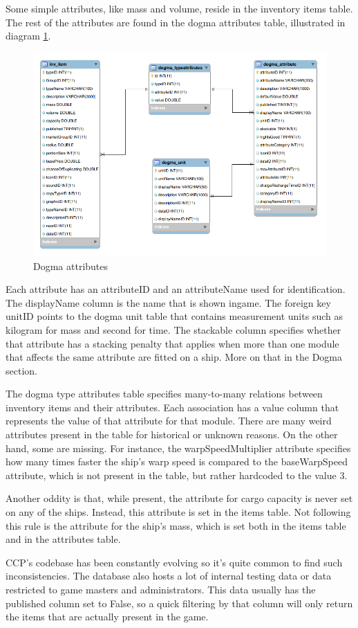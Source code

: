 Some simple attributes, like mass and volume, reside in the inventory items table. The rest of the attributes are found in the dogma attributes table, illustrated in diagram \ref{fig:dogmaattribs}.

\begin{figure}[h]
\centering
\includegraphics[width=0.7\linewidth]{src/img/dogmaattribs}
\caption{Dogma attributes}
\label{fig:dogmaattribs}
\end{figure}

Each attribute has an attributeID and an attributeName used for identification. The displayName column is the name that is shown ingame. The foreign key unitID points to the dogma unit table that contains measurement units such as kilogram for mass and second for time. The stackable column specifies whether that attribute has a stacking penalty \cite{stacking} that applies when more than one module that affects the same attribute are fitted on a ship. More on that in the Dogma section.

The dogma type attributes table specifies many-to-many relations between inventory items and their attributes. Each association has a value column that represents the value of that attribute for that module. There are many weird attributes present in the table for historical or unknown reasons. On the other hand, some are missing. For instance, the warpSpeedMultiplier attribute specifies how many times faster the ship’s warp speed is compared to the baseWarpSpeed attribute, which is not present in the table, but rather hardcoded to the value 3.

Another oddity is that, while present, the attribute for cargo capacity is never set on any of the ships. Instead, this attribute is set in the items table. Not following this rule is the attribute for the ship’s mass, which is set both in the items table and in the attributes table.

CCP’s codebase has been constantly evolving so it’s quite common to find such inconsistencies. The database also hosts a lot of internal testing data or data restricted to game masters and administrators. This data usually has the published column set to False, so a quick filtering by that column will only return the items that are actually present in the game.

